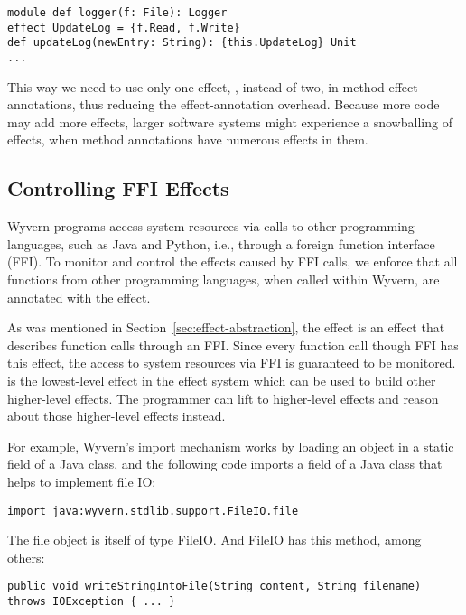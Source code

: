 \begin{minipage}{\linewidth}
\begin{lstlisting}[xleftmargin=-5pt, numbers=none]
module def logger(f: File): Logger
effect UpdateLog = {f.Read, f.Write}
def updateLog(newEntry: String): {this.UpdateLog} Unit
...
\end{lstlisting}
\end{minipage}
This way we need to use only one effect, , instead of two, in method effect annotations, thus reducing the effect-annotation overhead. Because more code may add more effects, larger software systems might experience a snowballing of effects, when method annotations have numerous effects in them.


\subsection{Controlling FFI Effects}
Wyvern programs access system resources via calls to other programming languages, such as Java and Python, i.e., through a foreign function interface (FFI). To monitor and control the effects caused by FFI calls, we enforce that all functions from other programming languages, when called within Wyvern, are annotated with the  effect. 

As was mentioned in Section~\ref{sec:effect-abstraction}, the  effect is an effect that describes function calls through an FFI. Since every function call though FFI has this effect, the access to system resources via FFI is guaranteed to be monitored.  is the lowest-level effect in the effect system which can be used to build other higher-level effects. The programmer can lift  to higher-level effects and reason about those higher-level effects instead.


For example, Wyvern’s import mechanism works by loading an object in a static field of a Java class, and the following code imports a field of a Java class that helps to implement file IO:\\
\begin{minipage}{\linewidth}
\begin{lstlisting}[xleftmargin=-5pt, numbers=none]
  import java:wyvern.stdlib.support.FileIO.file
\end{lstlisting}
\end{minipage}

The file object is itself of type FileIO. And FileIO has this method, among others: \\
\begin{minipage}{\linewidth}
\begin{lstlisting}[xleftmargin=3pt, numbers=none]
public void writeStringIntoFile(String content, String filename) throws IOException { ... }
\end{lstlisting}
\end{minipage}

